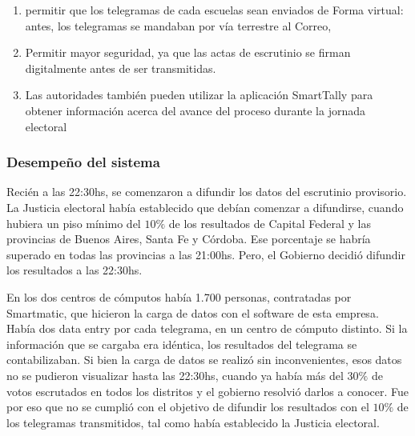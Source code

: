 \documentclass[titlepage,a4paper,twoside]{article}
\begin{document}
    \begin{enumerate}
    	\item permitir que los telegramas de cada escuelas sean enviados de Forma virtual: antes, los telegramas se mandaban por vía terrestre al Correo,
    	\item Permitir mayor seguridad, ya que las actas de escrutinio se firman digitalmente antes de ser transmitidas.
    	\item Las autoridades también pueden utilizar la aplicación SmartTally para obtener información acerca del avance del proceso durante la jornada electoral
    \end{enumerate}
    
    
    \subsubsection{Desempeño del sistema}
    
    
    Recién a las 22:30hs, se comenzaron a difundir los datos del escrutinio provisorio. La Justicia electoral había establecido que debían comenzar a difundirse, cuando hubiera un piso mínimo del $10\%$ de los resultados de Capital Federal y las provincias de Buenos Aires, Santa Fe y Córdoba. Ese porcentaje se habría superado en todas las provincias a las 21:00hs. Pero,  el Gobierno decidió difundir los resultados a las 22:30hs. 
    
    En los dos centros de cómputos había 1.700 personas, contratadas por Smartmatic, que hicieron la carga de datos con el software de esta empresa. Había dos data entry por cada telegrama, en un centro de cómputo distinto. Si la información que se cargaba era idéntica, los resultados del telegrama se contabilizaban. Si bien la carga de datos se realizó sin inconvenientes, esos datos no se pudieron visualizar hasta las 22:30hs, cuando ya había más del $30\%$ de votos escrutados en todos los distritos y el gobierno resolvió darlos a conocer. Fue por eso que no se cumplió con el objetivo de difundir los resultados con el $10\%$ de los telegramas transmitidos, tal como había establecido la Justicia electoral.
\end{document}
